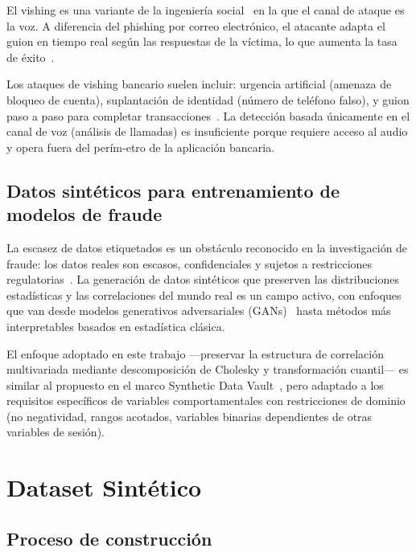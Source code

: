 \documentclass[journal]{IEEEtran}
\begin{document}
El vishing es una variante de la ingeniería social~\cite{tetri2013dissecting}
en la que el canal de ataque es la voz. A diferencia del phishing por correo
electrónico, el atacante adapta el guion en tiempo real según las respuestas
de la víctima, lo que aumenta la tasa de éxito~\cite{jagatic2007social}.

Los ataques de vishing bancario suelen incluir: urgencia artificial (amenaza
de bloqueo de cuenta), suplantación de identidad (número de teléfono
falso), y guion paso a paso para completar transacciones~\cite{apwg2023}.
La detección basada únicamente en el canal de voz (análisis de llamadas) es
insuficiente porque requiere acceso al audio y opera fuera del perím-etro de
la aplicación bancaria.

\subsection{Datos sintéticos para entrenamiento de modelos de fraude}

La escasez de datos etiquetados es un obstáculo reconocido en la
investigación de fraude: los datos reales son escasos, confidenciales y
sujetos a restricciones regulatorias~\cite{patki2016synthetic}. La generación
de datos sintéticos que preserven las distribuciones estadísticas y las
correlaciones del mundo real es un campo activo, con enfoques que van desde
modelos generativos adversariales (GANs)~\cite{nikolentzos2021synthetic}
hasta métodos más interpretables basados en estadística clásica.

El enfoque adoptado en este trabajo ---preservar la estructura de correlación
multivariada mediante descomposición de Cholesky y transformación cuantil--- es
similar al propuesto en el marco Synthetic Data Vault~\cite{patki2016synthetic},
pero adaptado a los requisitos específicos de variables comportamentales con
restricciones de dominio (no negatividad, rangos acotados, variables
binarias dependientes de otras variables de sesión).

\section{Dataset Sintético}
\label{sec:dataset}

\subsection{Proceso de construcción}
\end{document}

